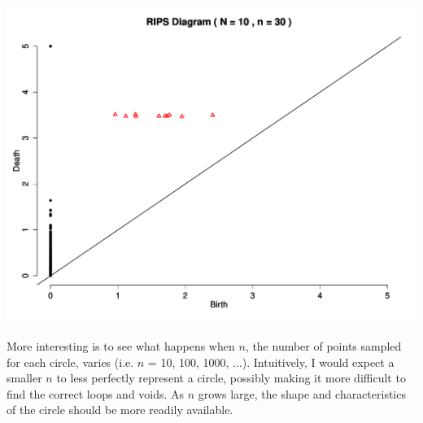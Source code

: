 \documentclass[a4paper]{article}
\begin{document}
\begin{center}
\includegraphics[width=0.55\linewidth]{RIPS_n30.pdf}
\end{center}

\noindent More interesting is to see what happens when $n$, the number of points sampled for each circle, varies (i.e. $n$ = 10, 100, 1000, ...). Intuitively, I would expect a smaller $n$ to less perfectly represent a circle, possibly making it more difficult to find the correct loops and voids. As $n$ grows large, the shape and characteristics of the circle should be more readily available. \newline
\end{document}

